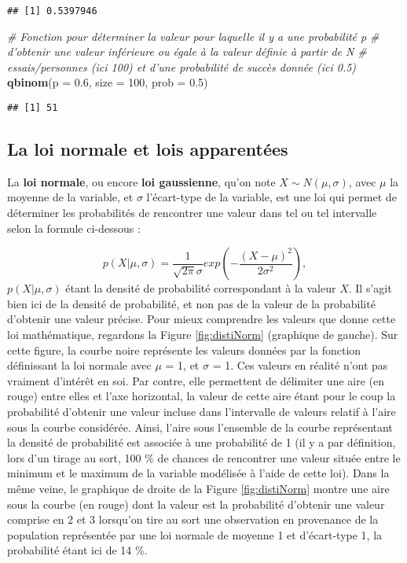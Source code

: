 \documentclass[
  french,
]{book}
\newenvironment{Shaded}{\begin{snugshade}}{\end{snugshade}}
\newcommand{\CommentTok}[1]{\textcolor[rgb]{0.56,0.35,0.01}{\textit{#1}}}
\newcommand{\DataTypeTok}[1]{\textcolor[rgb]{0.13,0.29,0.53}{#1}}
\newcommand{\DecValTok}[1]{\textcolor[rgb]{0.00,0.00,0.81}{#1}}
\newcommand{\FloatTok}[1]{\textcolor[rgb]{0.00,0.00,0.81}{#1}}
\newcommand{\KeywordTok}[1]{\textcolor[rgb]{0.13,0.29,0.53}{\textbf{#1}}}
\newcommand{\NormalTok}[1]{#1}
\begin{document}
\begin{verbatim}
## [1] 0.5397946
\end{verbatim}

\begin{Shaded}
\begin{Highlighting}[]
\CommentTok{# Fonction pour déterminer la valeur pour laquelle il y a une probabilité p }
\CommentTok{# d'obtenir une valeur inférieure ou égale à la valeur définie à partir de N }
\CommentTok{# essais/personnes (ici 100) et d'une probabilité de succès donnée (ici 0.5)}
\KeywordTok{qbinom}\NormalTok{(}\DataTypeTok{p =} \FloatTok{0.6}\NormalTok{, }\DataTypeTok{size =} \DecValTok{100}\NormalTok{, }\DataTypeTok{prob =} \FloatTok{0.5}\NormalTok{)}
\end{Highlighting}
\end{Shaded}

\begin{verbatim}
## [1] 51
\end{verbatim}

\hypertarget{la-loi-normale-et-lois-apparentuxe9es}{%
\subsection{La loi normale et lois apparentées}\label{la-loi-normale-et-lois-apparentuxe9es}}

La \textbf{loi normale}, ou encore \textbf{loi gaussienne}, qu'on note \(X \sim N(\mu, \sigma)\), avec \(\mu\) la moyenne de la variable, et \(\sigma\) l'écart-type de la variable, est une loi qui permet de déterminer les probabilités de rencontrer une valeur dans tel ou tel intervalle selon la formule ci-dessous :

\[p(X | \mu, \sigma) = \frac{1}{\sqrt{2\pi}\sigma} exp(-\frac{(X-\mu)^2}{2\sigma^2}),\]
\(p(X | \mu, \sigma)\) étant la densité de probabilité correspondant à la valeur \(X\). Il s'agit bien ici de la densité de probabilité, et non pas de la valeur de la probabilité d'obtenir une valeur précise. Pour mieux comprendre les valeurs que donne cette loi mathématique, regardons la Figure \ref{fig:distiNorm} (graphique de gauche). Sur cette figure, la courbe noire représente les valeurs données par la fonction définissant la loi normale avec \(\mu\) = 1, et \(\sigma\) = 1. Ces valeurs en réalité n'ont pas vraiment d'intérêt en soi. Par contre, elle permettent de délimiter une aire (en rouge) entre elles et l'axe horizontal, la valeur de cette aire étant pour le coup la probabilité d'obtenir une valeur incluse dans l'intervalle de valeurs relatif à l'aire sous la courbe considérée. Ainsi, l'aire sous l'ensemble de la courbe représentant la densité de probabilité est associée à une probabilité de 1 (il y a par définition, lors d'un tirage au sort, 100 \% de chances de rencontrer une valeur située entre le minimum et le maximum de la variable modélisée à l'aide de cette loi). Dans la même veine, le graphique de droite de la Figure \ref{fig:distiNorm} montre une aire sous la courbe (en rouge) dont la valeur est la probabilité d'obtenir une valeur comprise en 2 et 3 lorsqu'on tire au sort une observation en provenance de la population représentée par une loi normale de moyenne 1 et d'écart-type 1, la probabilité étant ici de 14 \%.
\end{document}
